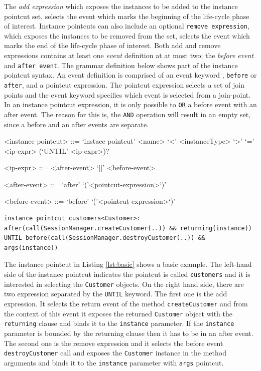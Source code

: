 \documentclass{llncs}
\begin{document}
The \emph{add expression} which exposes the instances to be added to the instance pointcut set, selects the event which marks the beginning of the life-cycle phase of interest. 
Instance pointcuts can also include an optional \texttt{remove expression},  which exposes the instances to be removed from the set, selects the event which marks the end of the life-cycle phase of interest.
 Both add and remove expressions contains at least one \emph{event} definition at at most two; the \emph{before event} and \texttt{after event}. The grammar definition below shows part of the instance pointcut syntax. 
An event definition is comprised of an event keyword , \texttt{before} or \texttt{after}, and a pointcut expression.
The pointcut expression selects a set of join points and the event keyword specifies which event is selected from a join-point. 
In an instance pointcut expression, it is only possible to \texttt{OR} a before event with an after event. 
The reason for this is, the \texttt{AND} operation will result in an empty set, since a before and an after events are separate.

\begin{grammar}
<instance pointcut> ::= `instace pointcut' <name> `<' <instanceType> `>' `=' <ip-expr> (`UNTIL' <ip-expr>)? 

<ip-expr> ::= <after-event> `||' <before-event>  

<after-event> ::= `after' `('<pointcut-expression>`)'

<before-event> ::= `before' `('<pointcut-expression>`)'
\end{grammar}


\begin{lstlisting}[float=h!, caption={A basic instance pointcut declaration with add and remove expressions}, label={lst:basic}]
instance pointcut customers<Customer>: after(call(SessionManager.createCustomer(..)) && returning(instance)) UNTIL before(call(SessionManager.destroyCustomer(..)) && args(instance))
\end{lstlisting}

The instance pointcut in Listing \ref{lst:basic} shows a basic example. The left-hand side of the instance pointcut indicates the pointcut is called \texttt{customers} and it is interested in selecting the \texttt{Customer} objects. 
On the right hand side, there are two expression separated by the \texttt{UNTIL} keyword. The first one is the add expression. It selects the return event of the method \texttt{createCustomer} and from the context of this event it exposes the returned \texttt{Customer} object with the \texttt{returning} clause and binds it to the \texttt{instance} parameter. If the \texttt{instance} parameter is bounded by the returning clause then it has to be in an after event. The second one is the remove expression and it selects the before event \texttt{destroyCustomer} call and exposes the \texttt{Customer} instance in the method arguments and binds it to the \texttt{instance} parameter with \texttt{args} pointcut.
\end{document}

